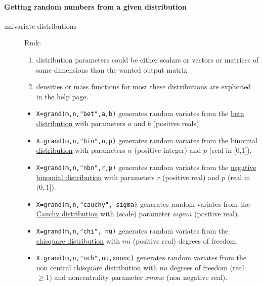 \paragraph{Getting random numbers from a given distribution}

\begin{description}
\item[univariate distributions] Rmk: 
\begin{enumerate}
\item distribution parameters could be either scalars or vectors or
  matrices of same dimensions than the wanted output matrix
\item densities or mass functions for most these distributions are
  explicited in the  help page.
\end{enumerate}

\begin{itemize}
\item {} \verb!X=grand(m,n,"bet",a,b)! generates random variates from 
  the \hyperlink{betapdf}{beta distribution} with parameters $a$ and $b$ (positive reals).

\item {} 
  \verb!X=grand(m,n,"bin",n,p)!  generates random variates from the \hyperlink{binpdf}{binomial 
  distribution} with parameters $n$ (positive integer) and $p$
  (real in [0,1]).

\item {} 
  \verb!X=grand(m,n,"nbn",r,p)! generates random variates from the \hyperlink{nbnpdf}{negative binomial 
  distribution} with parameters $r$ (positive real) and $p$ (real 
  in $(0,1]$).
  
\item {} 
  \verb!X=grand(m,n,"cauchy", sigma)! generates random variates from the  \hyperlink{caupdf}{Cauchy distribution} 
  with (scale) parameter $sigma$ (positive real).
  
\item {} 
  \verb!X=grand(m,n,"chi", nu)! generates random variates from the  \hyperlink{chipdf}{chisquare distribution} 
  with $nu$ (positive real) degrees of freedom. 
  
\item {} 
  \verb!X=grand(m,n,"nch",nu,xnonc)! generates random variates from the non central chisquare
  distribution with $nu$ degrees of freedom (real $\ge 1$) and
  noncentrality parameter $xnonc$ (non negative real).
  

\end{itemize}
\end{description}
